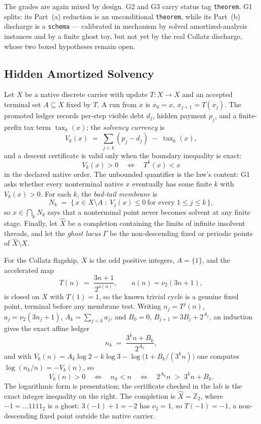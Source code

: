 \documentclass[11pt]{article}
\newcommand{\lawGOne}{Hidden Amortized Solvency}
\theoremstyle{definition}
\begin{document}
The grades are again mixed by design. G2 and G3 carry status tag \texttt{theorem}. G1 splits: its
Part~(a) reduction is an unconditional \texttt{theorem}, while its Part~(b) discharge is a
\texttt{schema} --- calibrated in mechanism by solved amortized-analysis instances and by a finite
ghost toy, but not yet by the real Collatz discharge, whose two boxed hypotheses remain open.

\subsection{\lawGOne}\label{sec:clusterA:g1}

Let $X$ be a native discrete carrier with update $T : X \to X$ and an accepted terminal set
$A \subseteq X$ fixed by $T$. A run from $x$ is $x_0 = x$, $x_{j+1} = T(x_j)$. The promoted ledger
records per-step visible debt $d_j$, hidden payment $p_j$, and a finite-prefix tax term
$\operatorname{tax}_k(x)$; the \emph{solvency currency} is
\[
  V_k(x) \;=\; \sum_{j<k} (p_j - d_j) \;-\; \operatorname{tax}_k(x),
\]
and a descent certificate is valid only when the boundary inequality is exact:
\[
  V_k(x) > 0 \quad\Longleftrightarrow\quad T^{k}(x) < x
\]
in the declared native order. The unbounded quantifier is the law's content: G1 asks whether every
nonterminal native $x$ eventually has some finite $k$ with $V_k(x) > 0$. For each $k$, the
\emph{bad-tail membrane} is
\[
  N_k \;=\; \{\, x \in X \setminus A \;:\; V_j(x) \le 0 \ \text{for every } 1 \le j \le k \,\},
\]
so $x \in \bigcap_k N_k$ says that a nonterminal point never becomes solvent at any finite stage.
Finally, let $\widehat{X}$ be a completion containing the limits of infinite insolvent threads, and
let the \emph{ghost locus} $\Gamma$ be the non-descending fixed or periodic points of
$\widehat{X} \setminus X$.

For the Collatz flagship, $X$ is the odd positive integers, $A = \{1\}$, and the accelerated map
\[
  T(n) \;=\; \frac{3n+1}{2^{a(n)}}, \qquad a(n) = \nu_2(3n+1),
\]
is closed on $X$ with $T(1) = 1$, so the known trivial cycle is a genuine fixed point, terminal before
any membrane test. Writing $n_j = T^{j}(n)$, $a_j = \nu_2(3 n_j + 1)$, $A_k = \sum_{j<k} a_j$, and
$B_0 = 0$, $B_{j+1} = 3 B_j + 2^{A_j}$, an induction gives the exact affine ledger
\[
  n_k \;=\; \frac{3^{k} n + B_k}{2^{A_k}},
\]
and with $V_k(n) = A_k \log 2 - k \log 3 - \log\!\bigl(1 + B_k / (3^k n)\bigr)$ one computes
$\log(n_k / n) = -V_k(n)$, so
\[
  V_k(n) > 0
  \quad\Longleftrightarrow\quad
  n_k < n
  \quad\Longleftrightarrow\quad
  2^{A_k} n \;>\; 3^{k} n + B_k .
\]
The logarithmic form is presentation; the certificate checked in the lab is the exact integer
inequality on the right. The completion is $\widehat{X} = \mathbb{Z}_2$, where $-1 = \ldots 1111_2$ is
a ghost: $3(-1) + 1 = -2$ has $\nu_2 = 1$, so $T(-1) = -1$, a non-descending fixed point outside the
native carrier.
\end{document}
